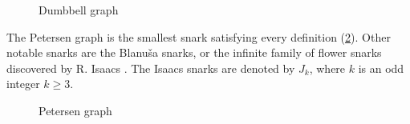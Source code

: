 \begin{figure}
	\centering
	
	\caption{Dumbbell graph}
	\label{fig:dumbbell}
\end{figure}

The Petersen graph is the smallest snark satisfying every definition (\cref{fig:petersen}). Other notable snarks are the Blanuša snarks, or the infinite family of flower snarks discovered by R. Isaacs \cite{Isaacs1975}. The Isaacs snarks are denoted by $J_k$, where $k$ is an odd integer $k\geq 3$.

\begin{figure}
	\centering
	
	\caption{Petersen graph}
	\label{fig:petersen}
\end{figure}